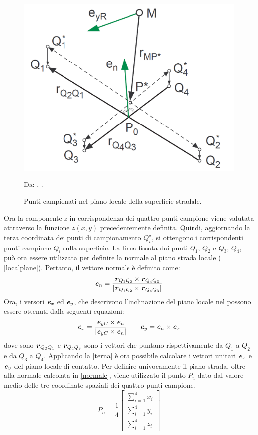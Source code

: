 \begin{figure}[h]
	\centering
	\includegraphics[width=0.5\linewidth]{Figures/local_track}
	\caption{Punti campionati nel piano locale della superficie stradale.}
	Da: \citeauthor{Rill}, .
	\label{localtrack}
\end{figure}

Ora la componente $z$ in corrispondenza dei quattro punti campione viene valutata attraverso la funzione $z(x,y)$ precedentemente definita. Quindi, aggiornando la terza coordinata dei punti di campionamento $Q^\star_i$, si ottengono i corrispondenti punti campione $Q_i$ sulla superficie. La linea fissata dai punti $Q_1$, $Q_2$ e $Q_3$, $Q_4$, può ora essere utilizzata per definire la normale al piano strada locale (\figurename{ \ref{localplane}}). Pertanto, il vettore normale è definito come:
%
\begin{equation}
\textbf{\textit{e}}_n = \frac{\textbf{\textit{r}}_{Q_1 Q_2} \times \textbf{\textit{r}}_{Q_4 Q_3}}{|\textbf{\textit{r}}_{Q_1 Q_2} \times \textbf{\textit{r}}_{Q_4 Q_3}|}
\label{normale}
\end{equation}
%
Ora, i versori $\textbf{\textit{e}}_x$ ed $\textbf{\textit{e}}_y$, che descrivono l'inclinazione del piano locale nel possono essere ottenuti dalle seguenti equazioni:
%
\begin{equation}
\textbf{\textit{e}}_x = \frac{\textbf{\textit{e}}_{yC}\times\textbf{\textit{e}}_{n}}{|\textbf{\textit{e}}_{yC}\times\textbf{\textit{e}}_{n}|}
\qquad
\textbf{\textit{e}}_{y} = \textbf{\textit{e}}_{n}\times\textbf{\textit{e}}_{x}
\label{terna}
\end{equation}
%
dove sono $\textbf{\textit{r}}_{Q_2 Q_1}$ e $\textbf{\textit{r}}_{Q_4 Q_3}$ sono i vettori che puntano rispettivamente da $Q_1$ a $Q_2$ e da $Q_3$ a $Q_4$. Applicando la \eqref{terna} è ora possibile calcolare i vettori unitari $\textbf{\textit{e}}_{x}$ e $\textbf{\textit{e}}_{y}$ del piano locale di contatto. Per definire univocamente il piano strada, oltre alla normale calcolata in \eqref{normale}, viene utilizzato il punto $P_n$ dato dal valore medio delle tre coordinate spaziali dei quattro punti campione.
%
\begin{equation}
P_n = \frac{1}{4}\begin{bmatrix}
\sum_{i=1}^{4} x_i \\
\sum_{i=1}^{4} y_i \\
\sum_{i=1}^{4} z_i
\end{bmatrix}
\end{equation}
%
